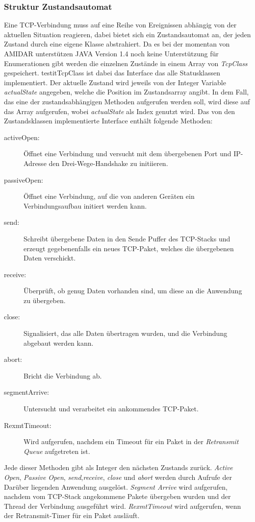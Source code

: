 \subsubsection{Struktur Zustandsautomat}
Eine TCP-Verbindung muss auf eine Reihe von Ereignissen abhängig von der aktuellen Situation reagieren, dabei bietet sich ein Zustandsautomat an, der jeden Zustand durch eine eigene Klasse abstrahiert. Da es bei der momentan von AMIDAR unterstützen JAVA Version 1.4 noch keine Unterstützung für Enumerationen gibt werden die einzelnen Zustände in einem Array von \textit{TcpClass} gespeichert. testit{TcpClass} ist dabei das Interface das alle Statusklassen implementiert. Der aktuelle Zustand wird jeweils von der Integer Variable \textit{actualState} angegeben, welche die Position im Zustandsarray angibt. In dem Fall, das eine der zustandsabhängigen Methoden aufgerufen werden soll, wird diese auf das Array aufgerufen, wobei \textit{actualState} als Index genutzt wird. Das von den Zustandsklassen implementierte Interface enthält folgende Methoden:
\begin{description}
\item[activeOpen:] Öffnet eine Verbindung und versucht mit dem übergebenen Port und IP-Adresse den Drei-Wege-Handshake zu initiieren. 
\item[passiveOpen:] Öffnet eine Verbindung, auf die von anderen Geräten ein Verbindungsaufbau initiert werden kann. 
\item[send:] Schreibt übergebene Daten in den Sende Puffer des TCP-Stacks und erzeugt gegebenenfalls ein neues TCP-Paket, welches die übergebenen Daten verschickt. 
\item[receive:] Überprüft, ob genug Daten vorhanden sind, um diese an die Anwendung zu übergeben. 
\item[close:] Signalisiert, das alle Daten übertragen wurden, und die Verbindung abgebaut werden kann. 
\item[abort:] Bricht die Verbindung ab.
\item[segmentArrive:] Untersucht und verarbeitet ein ankommendes TCP-Paket.
\item[RexmtTimeout:] Wird aufgerufen, nachdem ein Timeout für ein Paket in der \textit{Retransmit Queue} aufgetreten ist. 
\end{description}
Jede dieser Methoden gibt als Integer den nächsten Zustands zurück. \textit{Active Open}, \textit{Passive Open}, \textit{send},\textit{receive}, \textit{close} und \textit{abort} werden durch Aufrufe der Darüber liegenden Anwendung ausgelöst. \textit{Segment Arrive} wird aufgerufen, nachdem vom TCP-Stack angekommene Pakete übergeben wurden und der Thread der Verbindung ausgeführt wird. 
\textit{RexmtTimeout} wird aufgerufen, wenn der Retransmit-Timer für ein Paket ausläuft. 


